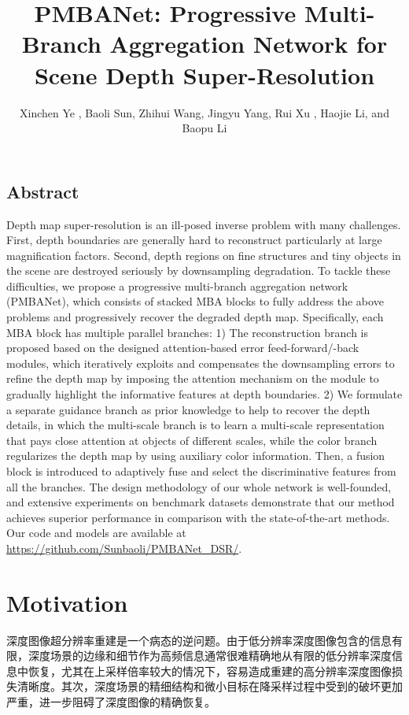 \documentclass{vip-theme}
\title{PMBANet: Progressive Multi-Branch Aggregation Network for Scene Depth Super-Resolution}
\author{
	Xinchen Ye , Baoli Sun, Zhihui Wang, Jingyu Yang, Rui Xu , Haojie Li, and Baopu Li %
}
\begin{document}
\maketitle
\label{title}

\vspace{0.5em}
\subsection*{Abstract} 
\label{abstract}
Depth map super-resolution is an ill-posed inverse problem with many challenges. First, depth boundaries are generally hard to reconstruct particularly at large magnification factors. Second, depth regions on fine structures and tiny objects in the scene are destroyed seriously by downsampling degradation. To tackle these difficulties, we propose a progressive multi-branch aggregation network (PMBANet), which consists of stacked MBA blocks to fully address the above problems and progressively recover the degraded depth map. Specifically, each MBA block has multiple parallel branches: 1) The reconstruction branch is proposed based on the designed attention-based error feed-forward/-back modules, which iteratively exploits and compensates the downsampling errors to refine the depth map by imposing the attention mechanism on the module to gradually highlight the informative features at depth boundaries. 2) We formulate a separate guidance branch as prior knowledge to help to recover the depth details, in which the multi-scale branch is to learn a multi-scale representation that pays close attention at objects of different scales, while the color branch regularizes the depth map by using auxiliary color information. Then, a fusion block is introduced to adaptively fuse and select the discriminative features from all the branches. The design methodology of our whole network is well-founded, and extensive experiments on benchmark datasets demonstrate that our method achieves superior performance in comparison with the state-of-the-art methods. Our code and models are available at \href{https://github.com/Sunbaoli/PMBANet\_DSR/}{\color{vipblue}https://github.com/Sunbaoli/PMBANet\_DSR/}.


\section{Motivation}
\label{motivation}

深度图像超分辨率重建是一个病态的逆问题。由于低分辨率深度图像包含的信息有限，深度场景的边缘和细节作为高频信息通常很难精确地从有限的低分辨率深度信息中恢复，尤其在上采样倍率较大的情况下，容易造成重建的高分辨率深度图像损失清晰度。其次，深度场景的精细结构和微小目标在降采样过程中受到的破坏更加严重，进一步阻碍了深度图像的精确恢复。
\end{document}
